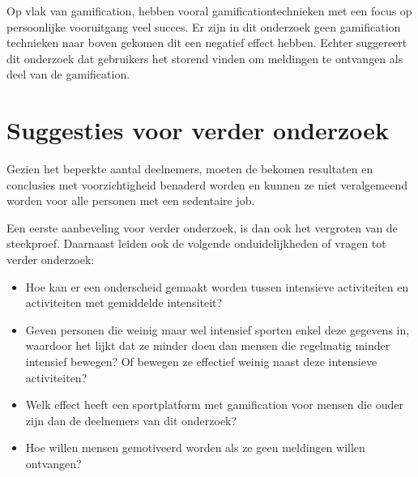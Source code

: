 Op vlak van gamification, hebben vooral gamificationtechnieken met een focus op persoonlijke vooruitgang veel succes. Er zijn in dit onderzoek geen gamification technieken naar boven gekomen dit een negatief effect hebben. Echter suggereert dit onderzoek dat gebruikers het storend vinden om meldingen te ontvangen als deel van de gamification.

\section{Suggesties voor verder onderzoek}

Gezien het beperkte aantal deelnemers, moeten de bekomen resultaten en conclusies met voorzichtigheid benaderd worden en kunnen ze niet veralgemeend worden voor alle personen met een sedentaire job.

Een eerste aanbeveling voor verder onderzoek, is dan ook het vergroten van de steekproef. Daarnaast leiden ook de volgende onduidelijkheden of vragen tot verder onderzoek:

\begin{itemize}
    \item Hoe kan er een onderscheid gemaakt worden tussen intensieve activiteiten en activiteiten met gemiddelde intensiteit?
    \item Geven personen die weinig maar wel intensief sporten enkel deze gegevens in, waardoor het lijkt dat ze minder doen dan mensen die regelmatig minder intensief bewegen? Of bewegen ze effectief weinig naast deze intensieve activiteiten?
    \item Welk effect heeft een sportplatform met gamification voor mensen die ouder zijn dan de deelnemers van dit onderzoek?
    \item Hoe willen mensen gemotiveerd worden als ze geen meldingen willen ontvangen?
\end{itemize}